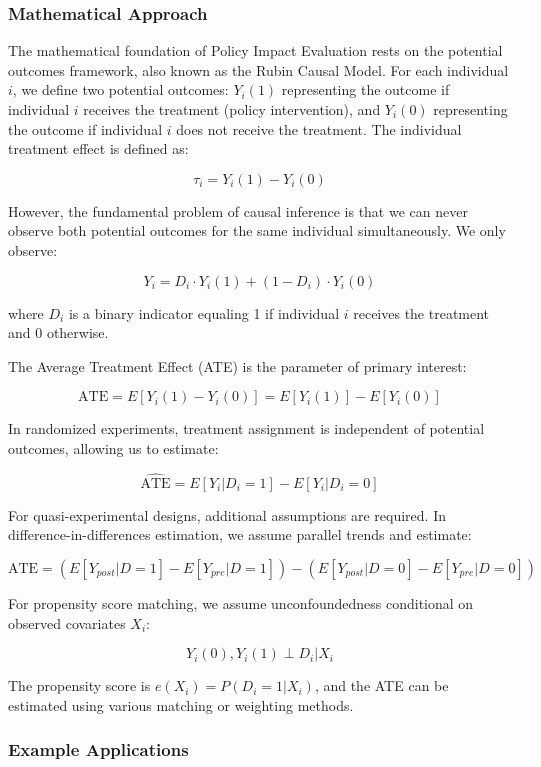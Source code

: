 \documentclass[main.tex]{subfiles}
\begin{document}
\subsubsection{Mathematical Approach}

The mathematical foundation of Policy Impact Evaluation rests on the potential outcomes framework, also known as the Rubin Causal Model\parencite{rubin_model,causal_inference_book}. For each individual $i$, we define two potential outcomes: $Y_i(1)$ representing the outcome if individual $i$ receives the treatment (policy intervention), and $Y_i(0)$ representing the outcome if individual $i$ does not receive the treatment. The individual treatment effect is defined as:

\[
\tau_i = Y_i(1) - Y_i(0)
\]

However, the fundamental problem of causal inference is that we can never observe both potential outcomes for the same individual simultaneously\parencite{causal_inference_book}. We only observe:

\[
Y_i = D_i \cdot Y_i(1) + (1-D_i) \cdot Y_i(0)
\]

where $D_i$ is a binary indicator equaling 1 if individual $i$ receives the treatment and 0 otherwise.

The Average Treatment Effect (ATE) is the parameter of primary interest:

\[
\text{ATE} = E[Y_i(1) - Y_i(0)] = E[Y_i(1)] - E[Y_i(0)]
\]

In randomized experiments, treatment assignment is independent of potential outcomes, allowing us to estimate:

\[
\widehat{\text{ATE}} = E[Y_i|D_i=1] - E[Y_i|D_i=0]
\]

For quasi-experimental designs, additional assumptions are required. In difference-in-differences estimation, we assume parallel trends and estimate:

\[
\text{ATE} = (E[Y_{post}|D=1] - E[Y_{pre}|D=1]) - (E[Y_{post}|D=0] - E[Y_{pre}|D=0])
\]

For propensity score matching, we assume unconfoundedness conditional on observed covariates $X_i$:

\[
Y_i(0), Y_i(1) \perp D_i | X_i
\]

The propensity score is $e(X_i) = P(D_i=1|X_i)$, and the ATE can be estimated using various matching or weighting methods\parencite{causal_inference_book}.

\subsubsection{Example Applications}
\end{document}
